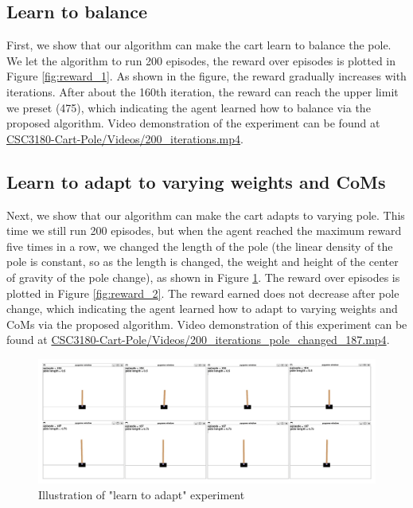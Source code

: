 \documentclass[10pt,a4paper]{article}
\begin{document}
\subsection{Learn to balance}
First, we show that our algorithm can make the cart learn to balance the pole. We let the algorithm to run 200 episodes, the reward over episodes is plotted in Figure \ref{fig:reward_1}. 
As shown in the figure, the reward gradually increases with iterations. After about the 160th iteration, the reward can reach the upper limit we preset (475), which indicating the agent learned how to balance via the proposed algorithm. Video demonstration of the experiment can be found at \href{https://1drv.ms/f/s!AmutmbT5H6Pkm0sNJx83Q54XewmB?e=HUkzYK}{CSC3180-Cart-Pole/Videos/200\_iterations.mp4}.



\subsection{Learn to adapt to varying weights and CoMs}
Next, we show that our algorithm can make the cart adapts to varying pole. This time we still run 200 episodes, but when the agent reached the maximum reward five times in a row, we changed the length of the pole (the linear density of the pole is constant, so as the length is changed, the weight and height of the center of gravity of the pole change), as shown in Figure \ref{fig:changepole}. The reward over episodes is plotted in Figure \ref{fig:reward_2}. The reward earned does not decrease after pole change, which indicating the agent learned how to adapt to varying weights and CoMs via the proposed algorithm. Video demonstration of this experiment can be found at \href{https://1drv.ms/f/s!AmutmbT5H6Pkm0sNJx83Q54XewmB?e=HUkzYK}{CSC3180-Cart-Pole/Videos/200\_iterations\_pole\_changed\_187.mp4}.

\begin{figure}
\centering
\includegraphics[width=1\linewidth]{figure/change_pole}
\caption{Illustration of "learn to adapt" experiment}
\label{fig:changepole}
\end{figure}
\end{document}
